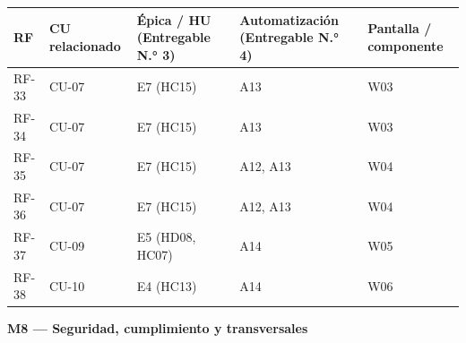 \documentclass[11pt,a4paper]{article}
\begin{document}
{\small
\begin{longtable}[]{@{}
  >{\raggedright\arraybackslash}p{}
  >{\raggedright\arraybackslash}p{}
  >{\raggedright\arraybackslash}p{}
  >{\raggedright\arraybackslash}p{}
  >{\raggedright\arraybackslash}p{}@{}}
\toprule\noalign{}
\begin{minipage}[b]{\linewidth}\raggedright
RF
\end{minipage} & \begin{minipage}[b]{\linewidth}\raggedright
CU relacionado
\end{minipage} & \begin{minipage}[b]{\linewidth}\raggedright
Épica / HU (Entregable N.° 3)
\end{minipage} & \begin{minipage}[b]{\linewidth}\raggedright
Automatización (Entregable N.° 4)
\end{minipage} & \begin{minipage}[b]{\linewidth}\raggedright
Pantalla / componente
\end{minipage} \\
\midrule\noalign{}
\endhead
\bottomrule\noalign{}
\endlastfoot
RF-33 & CU-07 & E7 (HC15) & A13 & W03 \\
RF-34 & CU-07 & E7 (HC15) & A13 & W03 \\
RF-35 & CU-07 & E7 (HC15) & A12, A13 & W04 \\
RF-36 & CU-07 & E7 (HC15) & A12, A13 & W04 \\
RF-37 & CU-09 & E5 (HD08, HC07) & A14 & W05 \\
RF-38 & CU-10 & E4 (HC13) & A14 & W06 \\
\end{longtable}
}

\textbf{M8 --- Seguridad, cumplimiento y transversales}
\end{document}
